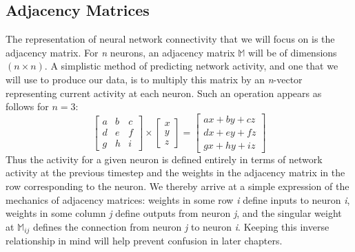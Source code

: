 \subsection{Adjacency Matrices}
\label{subsec:adjacency}
The representation of neural network connectivity that we will focus on is the 
adjacency matrix. For \textit{n} neurons, an adjacency matrix $\mathbb{M}$ will 
be of dimensions $(n \times n)$. A simplistic method of predicting network 
activity, and one that we will use to produce our data, is to multiply this 
matrix by an \textit{n}-vector representing current activity at each neuron.  
Such an operation appears as follows for $n=3$:
\[ \begin{bmatrix}
		a & b & c\\
		d & e & f\\
		g & h & i
	\end{bmatrix}
	\times
	\begin{bmatrix}
		x\\
		y\\
		z
	\end{bmatrix}
	=
	\begin{bmatrix}
		ax + by + cz\\
		dx + ey + fz\\
		gx + hy + iz
	\end{bmatrix}
\]
Thus the activity for a given neuron is defined entirely in terms of network 
activity at the previous timestep and the weights in the adjacency matrix in the 
row corresponding to the neuron. We thereby arrive at a simple expression of the 
mechanics of adjacency matrices: weights in some row \textit{i} define inputs to 
neuron \textit{i}, weights in some column \textit{j} define outputs from neuron 
\textit{j}, and the singular weight at $\mathbb{M}_{ij}$ defines the connection 
from neuron \textit{j} to neuron \textit{i}. Keeping this inverse relationship 
in mind will help prevent confusion in later chapters.
